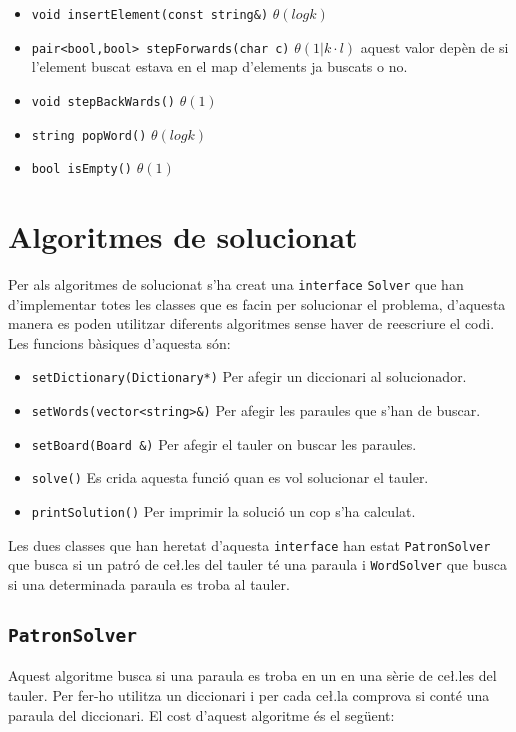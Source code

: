 ﻿\documentclass{article}
\begin{document}
\begin{itemize}
	\item \verb|void insertElement(const string&)| $\theta(log k)$
	\item \verb|pair<bool,bool> stepForwards(char c)| $\theta(1 | k·l)$ aquest valor depèn de si l'element buscat estava en el map d'elements ja buscats o no.
	\item \verb|void stepBackWards()| $\theta(1)$
	\item \verb|string popWord()| $\theta(log k)$
	\item \verb|bool isEmpty()| $\theta(1)$
\end{itemize}

\section{Algoritmes de solucionat}

Per als algoritmes de solucionat s'ha creat una \verb|interface| \verb|Solver| que han d'implementar totes les classes que es facin per solucionar el problema, d'aquesta manera es poden utilitzar diferents algoritmes sense haver de reescriure el codi. Les funcions bàsiques d'aquesta són:

\begin{itemize}
	\item \verb|setDictionary(Dictionary*)| Per afegir un diccionari al solucionador.
	\item \verb|setWords(vector<string>&)| Per afegir les paraules que s'han de buscar.
	\item \verb|setBoard(Board &)| Per afegir el tauler on buscar les paraules.
	\item \verb|solve()| Es crida aquesta funció quan es vol solucionar el tauler.
	\item \verb|printSolution()| Per imprimir la solució un cop s'ha calculat.
\end{itemize}

Les dues classes que han heretat d'aquesta \verb|interface| han estat \verb|PatronSolver| que busca si un patró de ce\l.les del tauler té una paraula i \verb|WordSolver| que busca si una determinada paraula es troba al tauler.

\subsection{\texttt{PatronSolver}}
Aquest algoritme busca si una paraula es troba en un en una sèrie de ce\l.les del tauler. Per fer-ho utilitza un diccionari i per cada ce\l.la comprova si conté una paraula del diccionari. El cost d'aquest algoritme és el següent:
\end{document}
